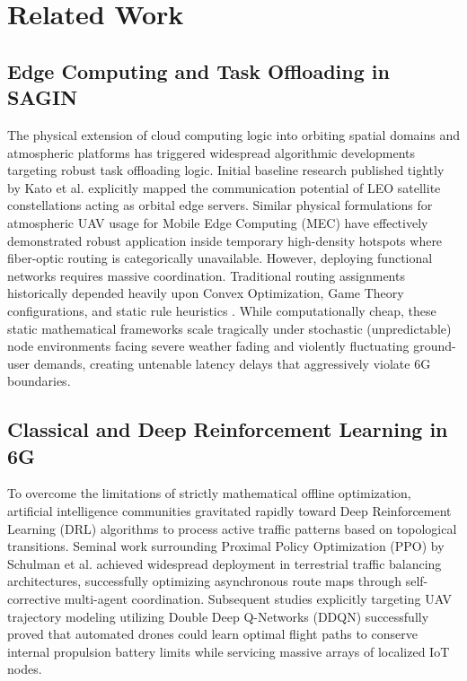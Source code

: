 \documentclass[conference]{IEEEtran}
\begin{document}
\section{Related Work}

\subsection{Edge Computing and Task Offloading in SAGIN}
The physical extension of cloud computing logic into orbiting spatial domains and atmospheric platforms has triggered widespread algorithmic developments targeting robust task offloading logic. Initial baseline research published tightly by Kato et al. \cite{kato2019} explicitly mapped the communication potential of LEO satellite constellations acting as orbital edge servers. Similar physical formulations for atmospheric UAV usage for Mobile Edge Computing (MEC) have effectively demonstrated robust application inside temporary high-density hotspots where fiber-optic routing is categorically unavailable. 
However, deploying functional networks requires massive coordination. Traditional routing assignments historically depended heavily upon Convex Optimization, Game Theory configurations, and static rule heuristics \cite{jiang2020}. While computationally cheap, these static mathematical frameworks scale tragically under stochastic (unpredictable) node environments facing severe weather fading and violently fluctuating ground-user demands, creating untenable latency delays that aggressively violate 6G boundaries.

\subsection{Classical and Deep Reinforcement Learning in 6G}
To overcome the limitations of strictly mathematical offline optimization, artificial intelligence communities gravitated rapidly toward Deep Reinforcement Learning (DRL) algorithms to process active traffic patterns based on topological transitions. Seminal work surrounding Proximal Policy Optimization (PPO) by Schulman et al. \cite{schulman2017} achieved widespread deployment in terrestrial traffic balancing architectures, successfully optimizing asynchronous route maps through self-corrective multi-agent coordination. Subsequent studies explicitly targeting UAV trajectory modeling utilizing Double Deep Q-Networks (DDQN) \cite{liu2018} successfully proved that automated drones could learn optimal flight paths to conserve internal propulsion battery limits while servicing massive arrays of localized IoT nodes. 
\end{document}
